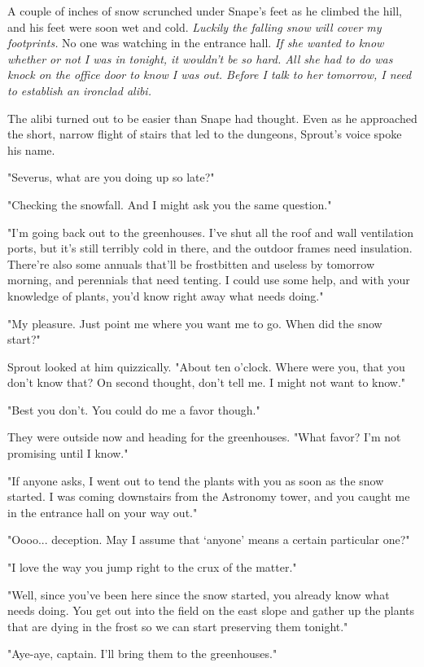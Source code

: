 \documentclass[a4paper,11pt]{article}
\begin{document}
A couple of inches of snow scrunched under Snape's feet as he climbed the hill, and his feet were soon wet and cold. \emph{Luckily the falling snow will cover my footprints.} No one was watching in the entrance hall. \emph{If she wanted to know whether or not I was in tonight, it wouldn't be so hard. All she had to do was knock on the office door to know I was out. Before I talk to her tomorrow, I need to establish an ironclad alibi.}

The alibi turned out to be easier than Snape had thought. Even as he approached the short, narrow flight of stairs that led to the dungeons, Sprout's voice spoke his name.

"Severus, what are you doing up so late?"

"Checking the snowfall. And I might ask you the same question."

"I'm going back out to the greenhouses. I've shut all the roof and wall ventilation ports, but it's still terribly cold in there, and the outdoor frames need insulation. There're also some annuals that'll be frostbitten and useless by tomorrow morning, and perennials that need tenting. I could use some help, and with your knowledge of plants, you'd know right away what needs doing."

"My pleasure. Just point me where you want me to go. When did the snow start?"

Sprout looked at him quizzically. "About ten o'clock. Where were you, that you don't know that? On second thought, don't tell me. I might not want to know."

"Best you don't. You could do me a favor though."

They were outside now and heading for the greenhouses. "What favor? I'm not promising until I know."

"If anyone asks, I went out to tend the plants with you as soon as the snow started. I was coming downstairs from the Astronomy tower, and you caught me in the entrance hall on your way out."

"Oooo... deception. May I assume that `anyone' means a certain particular one?"

"I love the way you jump right to the crux of the matter."

"Well, since you've been here since the snow started, you already know what needs doing. You get out into the field on the east slope and gather up the plants that are dying in the frost so we can start preserving them tonight."

"Aye-aye, captain. I'll bring them to the greenhouses."
\end{document}
